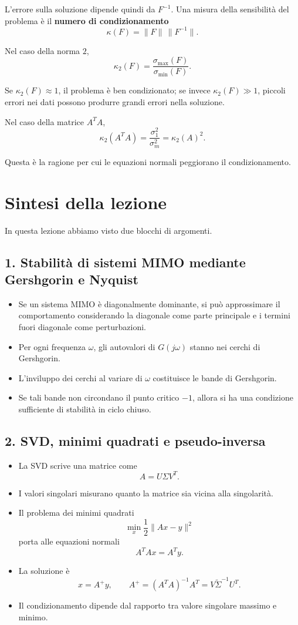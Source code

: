 L'errore sulla soluzione dipende quindi da \(F^{-1}\).  
Una misura della sensibilità del problema è il \textbf{numero di condizionamento}
\[
\kappa(F)=\|F\|\,\|F^{-1}\|.
\]

Nel caso della norma \(2\),
\[
\boxed{
\kappa_2(F)=\frac{\sigma_{\max}(F)}{\sigma_{\min}(F)}.
}
\]

Se \(\kappa_2(F)\approx 1\), il problema è ben condizionato; se invece \(\kappa_2(F)\gg 1\), piccoli errori nei dati possono produrre grandi errori nella soluzione.

Nel caso della matrice \(A^TA\),
\[
\kappa_2(A^TA)=\frac{\sigma_1^2}{\sigma_m^2}=\kappa_2(A)^2.
\]

Questa è la ragione per cui le equazioni normali peggiorano il condizionamento.

\section{Sintesi della lezione}

In questa lezione abbiamo visto due blocchi di argomenti.

\subsection*{1. Stabilità di sistemi MIMO mediante Gershgorin e Nyquist}
\begin{itemize}
    \item Se un sistema MIMO è diagonalmente dominante, si può approssimare il comportamento considerando la diagonale come parte principale e i termini fuori diagonale come perturbazioni.
    \item Per ogni frequenza \(\omega\), gli autovalori di \(G(j\omega)\) stanno nei cerchi di Gershgorin.
    \item L'inviluppo dei cerchi al variare di \(\omega\) costituisce le bande di Gershgorin.
    \item Se tali bande non circondano il punto critico \(-1\), allora si ha una condizione sufficiente di stabilità in ciclo chiuso.
\end{itemize}

\subsection*{2. SVD, minimi quadrati e pseudo-inversa}
\begin{itemize}
    \item La SVD scrive una matrice come
    \[
    A=U\Sigma V^T.
    \]
    \item I valori singolari misurano quanto la matrice sia vicina alla singolarità.
    \item Il problema dei minimi quadrati
    \[
    \min_x \frac12\|Ax-y\|^2
    \]
    porta alle equazioni normali
    \[
    A^TAx=A^Ty.
    \]
    \item La soluzione è
    \[
    x=A^+y,
    \qquad
    A^+=(A^TA)^{-1}A^T = V\widetilde\Sigma^{-1}U^T.
    \]
    \item Il condizionamento dipende dal rapporto tra valore singolare massimo e minimo.
\end{itemize}